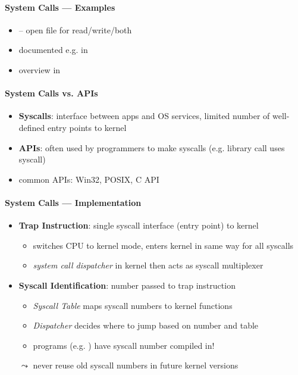 \paragraph{System Calls --- Examples}
\begin{itemize}
	\item {} -- open file for read/write/both
	\item documented e.g. in 
	\item overview in 
\end{itemize}

\paragraph{System Calls vs. APIs}
\begin{itemize}
	\item \textbf{Syscalls}: interface between apps and OS services, limited number of well-defined entry points to kernel
	\item \textbf{APIs}: often used by programmers to make syscalls (e.g.  library call uses  syscall)
	\item common APIs: Win32, POSIX, C API
\end{itemize}

\paragraph{System Calls --- Implementation}
\begin{itemize}
	\item \textbf{Trap Instruction}: single syscall interface (entry point) to kernel
	\begin{itemize}
		\item switches CPU to kernel mode, enters kernel in same way for all syscalls
		\item \emph{system call dispatcher} in kernel then acts as syscall multiplexer
	\end{itemize}
	\item \textbf{Syscall Identification}: number passed to trap instruction
	\begin{itemize}
		\item \emph{Syscall Table} maps syscall numbers to kernel functions
		\item \emph{Dispatcher} decides where to jump based on number and table
		\item programs (e.g. ) have syscall number compiled in!
	\end{itemize}
	$ \leadsto $ never reuse old syscall numbers in future kernel versions
\end{itemize}

